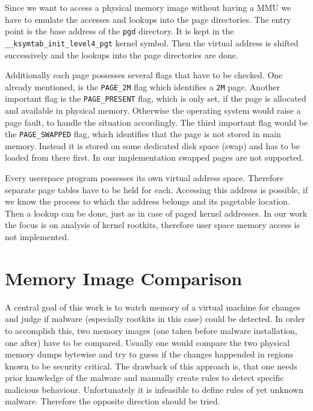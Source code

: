 Since we want to access a physical memory image without having a MMU we have to emulate the accesses and 
lookups into the page directories. The entry point is the base address of the \texttt{pgd} directory. 
It is kept in the \texttt{\_\_ksymtab\_init\_level4\_pgt} kernel symbol. 
Then the virtual address is shifted successively and the lookups into the page directories are done. 

Additionally each page possesses several flags that have to be checked. One already mentioned, 
is the \texttt{PAGE\_2M} flag which identifies a \texttt{2M} page. Another important flag is the 
\texttt{PAGE\_PRESENT} flag, which is only set, if the page is allocated and available in physical memory. 
Otherwise the operating system would raise a page fault, to handle the situation accordingly. 
The third important flag would be the \texttt{PAGE\_SWAPPED} flag, which identifies that the page 
is not stored in main memory. Instead it is stored on some dedicated disk space (swap) and has to 
be loaded from there first. In our implementation swapped pages are not supported.

Every userspace program possesses its own virtual address space. Therefore separate page tables 
have to be held for each. Accessing this address is possible, if we know the process to which the address 
belongs and its pagetable location. Then a lookup can be done, just as in case of paged kernel addresses. 
In our work the focus is on analysis of kernel rootkits, therefore user space memory access is not implemented.

\section{Memory Image Comparison}
A central goal of this work is to watch memory of a virtual machine for changes and judge if malware (especially rootkits in this case) could be detected.
In order to accomplish this, two memory images (one taken before malware installation, one after) have to be compared. Usually one would compare the two physical memory dumps bytewise and try to guess if the changes happended in regions known to be security critical.
The drawback of this approach is, that one needs prior knowledge of the malware and manually create rules to detect specific malicious behaviour.
Unfortunately it is infeasible to define rules of yet unknown malware.
Therefore the opposite direction should be tried.

